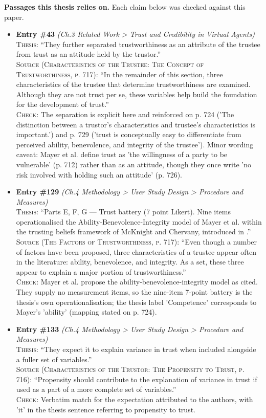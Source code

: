 \documentclass[11pt, a4paper]{article}
\begin{document}
\textbf{Passages this thesis relies on.} Each claim below was checked against this paper.
\begin{itemize}[leftmargin=1.2em,itemsep=4pt]
\item \textbf{Entry \#43} \textit{(Ch.3 Related Work > Trust and Credibility in Virtual Agents)}\\
\textsc{Thesis:} ``They further separated trustworthiness as an attribute of the trustee from trust as an attitude held by the trustor.''\\
\textsc{Source (Characteristics of the Trustee: The Concept of Trustworthiness, p. 717):} ``In the remainder of this section, three characteristics of the trustee that determine trustworthiness are examined. Although they are not trust per se, these variables help build the foundation for the development of trust.''\\
\textsc{Check:} The separation is explicit here and reinforced on p. 724 ('The distinction between a trustor's characteristics and trustee's characteristics is important.') and p. 729 ('trust is conceptually easy to differentiate from perceived ability, benevolence, and integrity of the trustee'). Minor wording caveat: Mayer et al. define trust as 'the willingness of a party to be vulnerable' (p. 712) rather than as an attitude, though they once write 'no risk involved with holding such an attitude' (p. 726).
\item \textbf{Entry \#129} \textit{(Ch.4 Methodology > User Study Design > Procedure and Measures)}\\
\textsc{Thesis:} ``Parts E, F, G — Trust battery (7 point Likert). Nine items operationalised the Ability-Benevolence-Integrity model of Mayer et al. within the trusting beliefs framework of McKnight and Chervany, introduced in .''\\
\textsc{Source (The Factors of Trustworthiness, p. 717):} ``Even though a number of factors have been proposed, three characteristics of a trustee appear often in the literature: ability, benevolence, and integrity. As a set, these three appear to explain a major portion of trustworthiness.''\\
\textsc{Check:} Mayer et al. propose the ability-benevolence-integrity model as cited. They supply no measurement items, so the nine-item 7-point battery is the thesis's own operationalisation; the thesis label 'Competence' corresponds to Mayer's 'ability' (mapping stated on p. 724).
\item \textbf{Entry \#133} \textit{(Ch.4 Methodology > User Study Design > Procedure and Measures)}\\
\textsc{Thesis:} ``They expect it to explain variance in trust when included alongside a fuller set of variables.''\\
\textsc{Source (Characteristics of the Trustor: The Propensity to Trust, p. 716):} ``Propensity should contribute to the explanation of variance in trust if used as a part of a more complete set of variables.''\\
\textsc{Check:} Verbatim match for the expectation attributed to the authors, with 'it' in the thesis sentence referring to propensity to trust.
\end{itemize}
\end{document}
